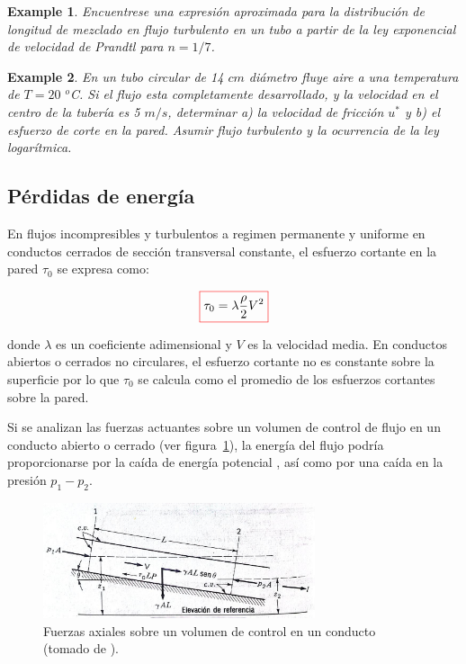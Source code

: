 \documentclass[11pt, oneside]{article}
\newtheorem{exa}{Example}
\begin{document}
\begin{shaded}
\begin{exa}
Encuentrese una expresi\'on  aproximada para la distribuci\'on de longitud de mezclado en flujo turbulento en un tubo a partir de la ley exponencial de velocidad de Prandtl para $n=1/7$. 
\end{exa}
\end{shaded}

\begin{shaded}
\begin{exa}
En un tubo circular de 14 $cm$ di\'ametro fluye aire a una temperatura de $T = 20$ $^o$C. Si el flujo esta completamente desarrollado, y la velocidad en el centro de la tuber\'ia es 5 $m/s$, determinar a) la velocidad de fricci\'on $u^*$ y b) el esfuerzo de corte en la pared. Asumir flujo turbulento y la ocurrencia de la ley logar\'itmica.
\end{exa}
\end{shaded}

\subsection{P\'erdidas de energ\'ia} %
En flujos incompresibles y turbulentos a regimen permanente y uniforme en conductos cerrados de secci\'on transversal constante, el esfuerzo cortante en la pared $\tau_0$ se expresa como:

\begin{equation}
\color{red}\boxed{\color{black} \tau_0 = \lambda \frac{\rho}{2} V^2 }
\label{perd0}
\end{equation}

donde $\lambda$ es un coeficiente  adimensional y $V$ es la velocidad media. En conductos abiertos o cerrados no circulares, el esfuerzo cortante no es constante sobre la superficie por lo que $\tau_0$ se calcula como el promedio de los esfuerzos cortantes sobre la pared. 

Si se analizan las fuerzas actuantes sobre un volumen de control de flujo en un conducto abierto o cerrado (ver figura~\ref{perd}), la energ\'ia del flujo podr\'ia proporcionarse por la ca\'ida de energ\'ia potencial , as\'i como por una ca\'ida en la presi\'on $p_1 - p_2$. 

\begin{figure}[h]
\centering
\includegraphics[width=8cm]{perd.jpeg}
\caption{Fuerzas axiales sobre un volumen de control en un conducto (tomado de \cite{streeter}).}
\label{perd}
\end{figure}
\end{document}
